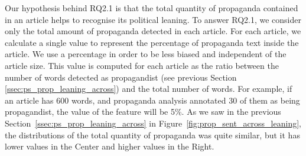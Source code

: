 Our hypothesis behind RQ2.1 is that the total quantity of propaganda contained in an article helps to recognise its political leaning. 
To answer RQ2.1, we consider only the total amount of propaganda detected in each article. For each article, we calculate a single value to represent the percentage of propaganda text inside the article. %
We use a percentage in order to be less biased and independent of the article size.
This value is computed for each article as the ratio between the number of words detected as propagandist (see previous Section \ref{ssec:ps_prop_leaning_across}) and the total number of words. For example, if an article has 600 words, and propaganda analysis annotated 30 of them as being propagandist, the value of the feature will be 5\%.  
As we saw in the previous Section~\ref{ssec:ps_prop_leaning_across} in Figure~\ref{fig:prop_sent_across_leaning}, the distributions of the total quantity of propaganda was quite similar, but it has lower values in the Center and higher values in the Right.


